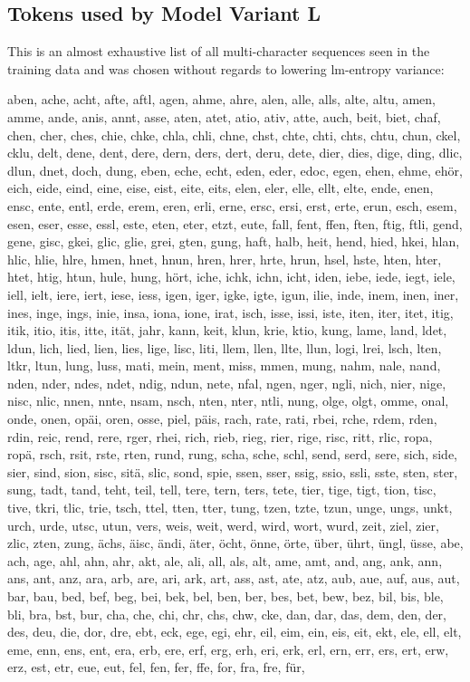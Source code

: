 \subsection{Tokens used by Model Variant L}
This is an almost exhaustive list of all multi-character sequences seen in the training data and was chosen without regards to lowering lm-entropy variance:

aben, ache, acht, afte, aftl, agen, ahme, ahre, alen, alle, alls, alte, altu, amen, amme, ande, anis, annt, asse, aten, atet, atio, ativ, atte, auch, beit, biet, chaf, chen, cher, ches, chie, chke, chla, chli, chne, chst, chte, chti, chts, chtu, chun, ckel, cklu, delt, dene, dent, dere, dern, ders, dert, deru, dete, dier, dies, dige, ding, dlic, dlun, dnet, doch, dung, eben, eche, echt, eden, eder, edoc, egen, ehen, ehme, ehör, eich, eide, eind, eine, eise, eist, eite, eits, elen, eler, elle, ellt, elte, ende, enen, ensc, ente, entl, erde, erem, eren, erli, erne, ersc, ersi, erst, erte, erun, esch, esem, esen, eser, esse, essl, este, eten, eter, etzt, eute, fall, fent, ffen, ften, ftig, ftli, gend, gene, gisc, gkei, glic, glie, grei, gten, gung, haft, halb, heit, hend, hied, hkei, hlan, hlic, hlie, hlre, hmen, hnet, hnun, hren, hrer, hrte, hrun, hsel, hste, hten, hter, htet, htig, htun, hule, hung, hört, iche, ichk, ichn, icht, iden, iebe, iede, iegt, iele, iell, ielt, iere, iert, iese, iess, igen, iger, igke, igte, igun, ilie, inde, inem, inen, iner, ines, inge, ings, inie, insa, iona, ione, irat, isch, isse, issi, iste, iten, iter, itet, itig, itik, itio, itis, itte, ität, jahr, kann, keit, klun, krie, ktio, kung, lame, land, ldet, ldun, lich, lied, lien, lies, lige, lisc, liti, llem, llen, llte, llun, logi, lrei, lsch, lten, ltkr, ltun, lung, luss, mati, mein, ment, miss, mmen, mung, nahm, nale, nand, nden, nder, ndes, ndet, ndig, ndun, nete, nfal, ngen, nger, ngli, nich, nier, nige, nisc, nlic, nnen, nnte, nsam, nsch, nten, nter, ntli, nung, olge, olgt, omme, onal, onde, onen, opäi, oren, osse, piel, päis, rach, rate, rati, rbei, rche, rdem, rden, rdin, reic, rend, rere, rger, rhei, rich, rieb, rieg, rier, rige, risc, ritt, rlic, ropa, ropä, rsch, rsit, rste, rten, rund, rung, scha, sche, schl, send, serd, sere, sich, side, sier, sind, sion, sisc, sitä, slic, sond, spie, ssen, sser, ssig, ssio, ssli, sste, sten, ster, sung, tadt, tand, teht, teil, tell, tere, tern, ters, tete, tier, tige, tigt, tion, tisc, tive, tkri, tlic, trie, tsch, ttel, tten, tter, tung, tzen, tzte, tzun, unge, ungs, unkt, urch, urde, utsc, utun, vers, weis, weit, werd, wird, wort, wurd, zeit, ziel, zier, zlic, zten, zung, ächs, äisc, ändi, äter, öcht, önne, örte, über, ührt, üngl, üsse, abe, ach, age, ahl, ahn, ahr, akt, ale, ali, all, als, alt, ame, amt, and, ang, ank, ann, ans, ant, anz, ara, arb, are, ari, ark, art, ass, ast, ate, atz, aub, aue, auf, aus, aut, bar, bau, bed, bef, beg, bei, bek, bel, ben, ber, bes, bet, bew, bez, bil, bis, ble, bli, bra, bst, bur, cha, che, chi, chr, chs, chw, cke, dan, dar, das, dem, den, der, des, deu, die, dor, dre, ebt, eck, ege, egi, ehr, eil, eim, ein, eis, eit, ekt, ele, ell, elt, eme, enn, ens, ent, era, erb, ere, erf, erg, erh, eri, erk, erl, ern, err, ers, ert, erw, erz, est, etr, eue, eut, fel, fen, fer, ffe, for, fra, fre, für, 